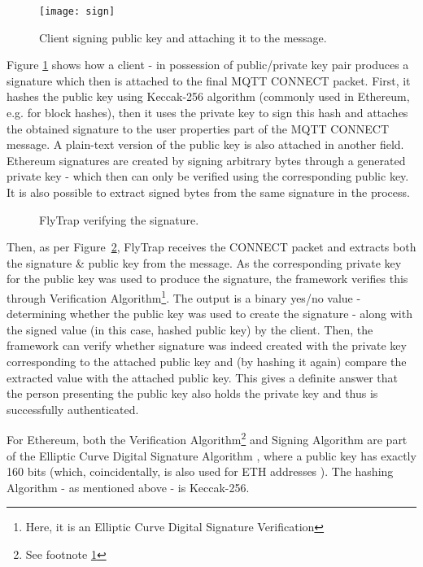 \begin{figure}[h]
    \centering
    \texttt{[image: sign]}
    \caption{Client signing public key and attaching it to the message.}
    \label{fig:sign}
\end{figure}

Figure \ref{fig:sign} shows how a client - in possession of public/private key pair produces a signature which then is attached to the final MQTT CONNECT packet. First, it hashes the public key using Keccak-256 algorithm \cite{bertoni2009keccak} (commonly used in Ethereum, e.g. for block hashes), then it uses the private key to sign this hash and attaches the obtained signature to the user properties part of the MQTT CONNECT message. A plain-text version of the public key is also attached in another field. Ethereum signatures are created by signing arbitrary bytes through a generated private key - which then can only be verified using the corresponding public key. It is also possible to extract signed bytes from the same signature in the process.

\begin{figure}[h]
    \centering
    \caption{FlyTrap verifying the signature.}
    \label{fig:verify}
\end{figure}

Then, as per Figure~\ref{fig:verify}, FlyTrap receives the CONNECT packet and extracts both the signature \& public key from the message. As the corresponding private key for the public key was used to produce the signature, the framework verifies this through Verification Algorithm\footnote{\label{fot1}Here, it is an Elliptic Curve Digital Signature Verification}. The output is a binary yes/no value - determining whether the public key was used to create the signature - along with the signed value (in this case, hashed public key) by the client. Then, the framework can verify whether signature was indeed created with the private key corresponding to the attached public key and (by hashing it again) compare the extracted value with the attached public key. This gives a definite answer that the person presenting the public key also holds the private key and thus is successfully authenticated.

For Ethereum, both the Verification Algorithm\footnote{See footnote \ref{fot1}} and Signing Algorithm are part of the Elliptic Curve Digital Signature Algorithm \citep{johnson2001elliptic}, where a public key has exactly 160 bits (which, coincidentally, is also used for ETH addresses \cite{dameron2017beigepaper}). The hashing Algorithm - as mentioned above - is Keccak-256.

